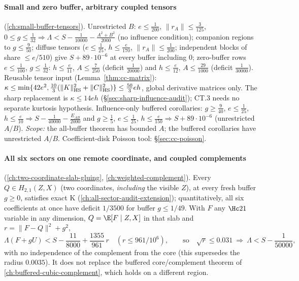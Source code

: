 \paragraph{Small and zero buffer, arbitrary coupled tensors} (\autoref{ch:small-buffer-tensors}). Unrestricted $B$: $e\le\frac1{200}$,
$\|r_A\|\le\frac3{125}$, $0\le g\le\frac1{32}\Rightarrow\Lambda<S-\frac1{10000}-\frac{A^2+B^2}{2000}$ (no influence condition); companion regions to $g\le\frac9{50}$;
diffuse tensors ($e\le\frac1{25}$, $h\le\frac e{170}$, $\|r_A\|\le\frac1{200}$; independent blocks of share $\le e/510$) give $S+89\cdot10^{-6}$ at every
buffer including $0$; zero-buffer rows $e\le\frac1{100}$, $g\le\frac1{32}$: $h\le\frac e{11}$, $A\le\frac7{250}$ (deficit $\frac1{20000}$) and $h\le\frac e{12}$,
$A\le\frac{29}{1000}$ (deficit $\frac1{30000}$). Reusable tensor input (Lemma~\ref{thm:cc-matrix}):
$\kappa\le\min\{42e^2,\frac{10}3(\|K\|_{\rm HS}^2+\|C\|_{\rm HS}^2)\}\le\frac{50}3eh$, global derivative matrices only. The sharp replacement is $\kappa\le14eh$ (\S\ref{sec:sharp-influence-audit}); CT.3 needs no separate kurtosis hypothesis. Influence-only buffered corollaries:
$g\ge\frac9{40}$, $e\le\frac1{25}$, $h\le\frac e{10}\Rightarrow S-\frac1{40000}-\frac{E_{AB}}{2000}$ and $g\ge\frac15$, $e\le\frac1{25}$, $h\le\frac e{150}\Rightarrow S+89\cdot10^{-6}$
(unrestricted $A/B$). \emph{Scope:} the all-buffer theorem has bounded $A$; the buffered corollaries have unrestricted $A/B$. Coefficient-disk Poisson tool:
\S\ref{sec:cc-poisson}.

\paragraph{All six sectors on one remote coordinate, and coupled complements} (\autoref{ch:two-coordinate-slab-gluing}, \autoref{ch:weighted-complement}). Every
$Q\in H_{2,1}(Z,X)$ (two coordinates, \emph{including} the visible $Z$), at every fresh buffer $g\ge0$, satisfies exact K (\autoref{ch:all-sector-audit-extension});
quantitatively, all six coefficients at once have deficit $1/3500$ for buffer $g\le1/49$. With $F$ any $\Hc21$ variable in any dimension, $Q=\E[F\mid Z,X]$ in that
slab and $r=\|F-Q\|^2+g^2$,
\[
 \Lambda(F+gU)<S-\frac{11}{8000}+\frac{1355}{961}\,r\quad(r\le961/10^6),\qquad\text{so}\quad\sqrt r\le0.031\ \Rightarrow\ \Lambda<S-\frac1{50000},
\]
with no independence of the complement from the core (this supersedes the radius $0.0035$). It does not replace the buffered core/complement theorem of
\autoref{ch:buffered-cubic-complement}, which holds on a different region.

